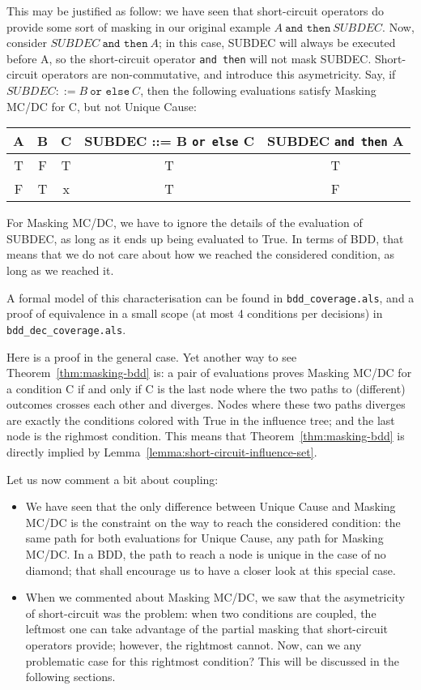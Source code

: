 \documentclass[a4paper,12pt,twoside]{article}
\newcommand{\andthen}{\texttt{and then}}
\newcommand{\orelse}{\texttt{or else}}
\newcommand{\alloyspec}[1]{\texttt{#1}}
\begin{document}
This may be justified as follow: we have seen that short-circuit operators
do provide some sort of masking in our original example
$A \ \andthen{} \ SUBDEC$. Now, consider $SUBDEC \ \andthen{} \ A$; in this
case, SUBDEC will always be executed before A, so the short-circuit operator
\andthen{} will not mask SUBDEC. Short-circuit operators are non-commutative,
and introduce this asymetricity. Say, if $SUBDEC ::= B \ \orelse \ C$, then
the following evaluations satisfy Masking MC/DC for C, but not Unique Cause:

\begin{center}
\begin{tabular}{|c|c|c||c||c|}
\hline
A & B & C & SUBDEC ::= B \orelse{} C & SUBDEC \andthen{} A \\ \hline
T & F & T & T                        & T \\ \hline
F & T & x & T                        & F \\ \hline
\end{tabular}
\end{center}

For Masking MC/DC, we have to ignore the details of the evaluation of SUBDEC,
as long as it ends up being evaluated to True. In terms of BDD, that means
that we do not care about how we reached the considered condition, as long
as we reached it.

A formal model of this characterisation can be found in
\alloyspec{bdd\_coverage.als}, and a proof of equivalence in a small scope
(at most 4 conditions per decisions) in \alloyspec{bdd\_dec\_coverage.als}.

Here is a proof in the general case. Yet another way to see
Theorem~\ref{thm:masking-bdd} is: a pair of evaluations proves Masking
MC/DC for a condition C if and only if C is the last node where the
two paths to (different) outcomes crosses each other and
diverges. Nodes where these two paths diverges are exactly the
conditions colored with True in the influence tree; and the last node
is the righmost condition.  This means that
Theorem~\ref{thm:masking-bdd} is directly implied by
Lemma~\ref{lemma:short-circuit-influence-set}.

Let us now comment a bit about coupling:
\begin{itemize}

\item We have seen that the only difference between Unique Cause and
Masking MC/DC is the constraint on the way to reach the considered
condition: the same path for both evaluations for Unique Cause, any
path for Masking MC/DC. In a BDD, the path to reach a node is unique
in the case of no diamond; that shall encourage us to have a closer
look at this special case.

\item When we commented about Masking MC/DC, we saw that the
asymetricity of short-circuit was the problem: when two conditions are
coupled, the leftmost one can take advantage of the partial masking that
short-circuit operators provide; however, the rightmost cannot. Now,
can we any problematic case for this rightmost condition? This will be
discussed in the following sections.
\end{itemize}
\end{document}
